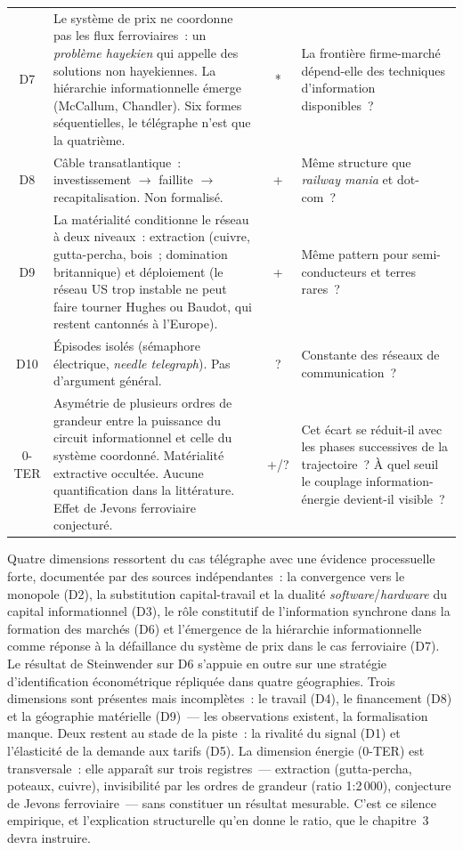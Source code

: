 \begin{table}[p]
\begin{tabularx}{\textwidth}{@{}cXcp{4.8cm}@{}}
D7 & Le système de prix ne coordonne pas les flux ferroviaires~: un \emph{problème hayekien} qui appelle des solutions non hayekiennes. La hiérarchie informationnelle émerge (McCallum, Chandler). Six formes séquentielles, le télégraphe n'est que la quatrième. & * & La frontière firme-marché dépend-elle des techniques d'information disponibles~? \\[3pt]
D8 & Câble transatlantique~: investissement $\rightarrow$ faillite $\rightarrow$ recapitalisation. Non formalisé. & + & Même structure que \emph{railway mania} et dot-com~? \\[3pt]
D9 & La matérialité conditionne le réseau à deux niveaux~: extraction (cuivre, gutta-percha, bois~; domination britannique) et déploiement (le réseau US trop instable ne peut faire tourner Hughes ou Baudot, qui restent cantonnés à l'Europe). & + & Même pattern pour semi-conducteurs et terres rares~? \\[3pt]
D10 & Épisodes isolés (sémaphore électrique, \emph{needle telegraph}). Pas d'argument général. & ? & Constante des réseaux de communication~? \\[3pt]
\midrule
0-TER & Asymétrie de plusieurs ordres de grandeur entre la puissance du circuit informationnel et celle du système coordonné. Matérialité extractive occultée. Aucune quantification dans la littérature. Effet de Jevons ferroviaire conjecturé. & +/? & Cet écart se réduit-il avec les phases successives de la trajectoire~? À quel seuil le couplage information-énergie devient-il visible~? \\
\bottomrule
\end{tabularx}
\renewcommand{\arraystretch}{1.0}
\end{table}

Quatre dimensions ressortent du cas télégraphe avec une évidence processuelle forte, documentée par des sources indépendantes~: la convergence vers le monopole (D2), la substitution capital-travail et la dualité \emph{software}/\emph{hardware} du capital informationnel (D3), le rôle constitutif de l'information synchrone dans la formation des marchés (D6) et l'émergence de la hiérarchie informationnelle comme réponse à la défaillance du système de prix dans le cas ferroviaire (D7). Le résultat de Steinwender sur D6 s'appuie en outre sur une stratégie d'identification économétrique répliquée dans quatre géographies. Trois dimensions sont présentes mais incomplètes~: le travail (D4), le financement (D8) et la géographie matérielle (D9)~--- les observations existent, la formalisation manque. Deux restent au stade de la piste~: la rivalité du signal (D1) et l'élasticité de la demande aux tarifs (D5). La dimension énergie (0-TER) est transversale~: elle apparaît sur trois registres~--- extraction (gutta-percha, poteaux, cuivre), invisibilité par les ordres de grandeur (ratio 1:2\,000), conjecture de Jevons ferroviaire~--- sans constituer un résultat mesurable. C'est ce silence empirique, et l'explication structurelle qu'en donne le ratio, que le chapitre~3 devra instruire.


